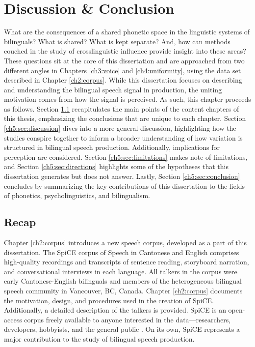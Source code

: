 
\chapter{Discussion \& Conclusion}\label{ch5:discussion}


What are the consequences of a shared phonetic space in the linguistic systems of bilinguals? What is shared? What is kept separate? And, how can methods couched in the study of crosslinguistic influence provide insight into these areas? These questions sit at the core of this dissertation and are approached from two different angles in Chapters \ref{ch3:voice} and \ref{ch4:uniformity}, using the data set described in Chapter \ref{ch2:corpus}. While this dissertation focuses on describing and understanding the bilingual speech signal in production, the uniting motivation comes from how the signal is perceived. As such, this chapter proceeds as follows. Section \ref{ch5:sec:recap} recapitulates the main points of the content chapters of this thesis, emphasizing the conclusions that are unique to each chapter. Section \ref{ch5:sec:discussion} dives into a more general discussion, highlighting how the studies conspire together to inform a broader understanding of how variation is structured in bilingual speech production. Additionally, implications for perception are considered. Section \ref{ch5:sec:limitations} makes note of limitations, and Section \ref{ch5:sec:directions} highlights some of the hypotheses that this dissertation generates but does not answer. Lastly, Section \ref{ch5:sec:conclusion} concludes by summarizing the key contributions of this dissertation to the fields of phonetics, psycholinguistics, and bilingualism.

\section{Recap}\label{ch5:sec:recap}

Chapter \ref{ch2:corpus} introduces a new speech corpus, developed as a part of this dissertation. The SpiCE corpus of Speech in Cantonese and English comprises high-quality recordings and transcripts of sentence reading, storyboard narration, and conversational interviews in each language. All talkers in the corpus were early Cantonese-English bilinguals and members of the heterogeneous bilingual speech community in Vancouver, BC, Canada. Chapter \ref{ch2:corpus} documents the motivation, design, and procedures used in the creation of SpiCE. Additionally, a detailed description of the talkers is provided. SpiCE is an open-access corpus freely available to anyone interested in the data---researchers, developers, hobbyists, and the general public \citep{johnson_2021_spice}. On its own, SpiCE represents a major contribution to the study of bilingual speech production. 


